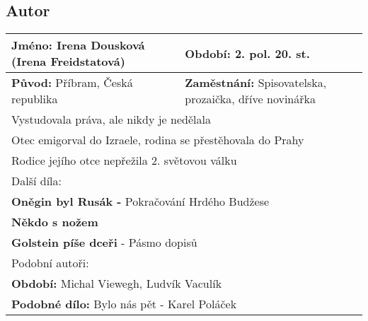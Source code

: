 \subsection*{Autor}
\begin{tabularx}{\linewidth}{l|l}
    \textbf{Jméno:} Irena Dousková (Irena Freidstatová) & \textbf{Období:} 2. pol. 20. st.                               \\
    \hline
    \textbf{Původ:} Příbram, Česká republika            & \textbf{Zaměstnání:} Spisovatelska, prozaička, dříve novinářka \\
    \hline
    \multicolumn{2}{l}{Vystudovala práva, ale nikdy je nedělala}                                                         \\
    \multicolumn{2}{l}{Otec emigorval do Izraele, rodina se přestěhovala do Prahy}                                       \\
    \multicolumn{2}{l}{Rodice jejího otce nepřežila 2. světovou válku}                                                   \\
    \hline
    \multicolumn{2}{l}{Další díla:}                                                                                      \\
    \multicolumn{2}{l}{\textbf{Oněgin byl Rusák -} Pokračování Hrdého Budžese}                                           \\
    \multicolumn{2}{l}{\textbf{Někdo s nožem}}                                                                           \\
    \multicolumn{2}{l}{\textbf{Golstein píše dceři} - Pásmo dopisů}                                                      \\
    \hline
    \multicolumn{2}{l}{Podobní autoři:}                                                                                  \\
    \multicolumn{2}{l}{\textbf{Období:} Michal Viewegh, Ludvík Vaculík}                                                  \\
    \multicolumn{2}{l}{\textbf{Podobné dílo:} Bylo nás pět - Karel Poláček}                                              \\
\end{tabularx}
